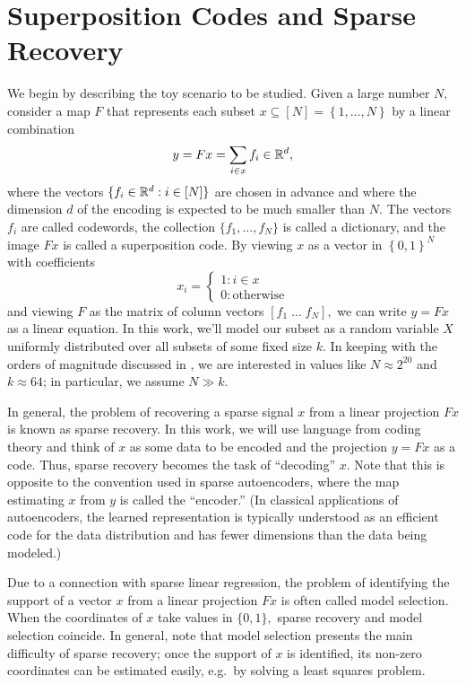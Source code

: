 \section{Superposition Codes and Sparse Recovery \label{sec:codes}}

We begin by describing the toy scenario to be studied. Given a large number $N,$ consider a map $F$ that represents each subset $x \subseteq [N] = \left\{ 1, \dots, N \right\}$ by a linear combination
$$
	y = F x = \sum_{i \in x} f_i \in \mathbb{R}^d,
$$
where the vectors $\{ f_i \in \mathbb{R}^d : i \in [N] \}$ are chosen in advance and where the dimension $d$ of the encoding is expected to be much smaller than $N.$ The vectors $f_i$ are called codewords, the collection $\{ f_1, \dots, f_N \}$ is called a dictionary, and the image $Fx$ is called a superposition code. By viewing $x$ as a vector in $\left\{ 0, 1 \right\}^N$ with coefficients
$$
	x_i = \begin{cases}
		1 \colon i \in x \\
		0 \colon \text{otherwise}
	\end{cases}
$$
and viewing $F$ as the matrix of column vectors $[f_1 \; \dots \; f_N],$ we can write $y = F x$ as a linear equation. In this work, we'll model our subset as a random variable $X$ uniformly distributed over all subsets of some fixed size $k.$ In keeping with the orders of magnitude discussed in \citet{gao_scaling_2024}, we are interested in values like $N \approx 2^{20}$ and $k \approx 64$; in particular, we assume $N \gg k.$

In general, the problem of recovering a sparse signal $x$ from a linear projection $F x$ is known as sparse recovery. In this work, we will use language from coding theory and think of $x$ as some data to be encoded and the projection $y = F x$ as a code. Thus, sparse recovery becomes the task of ``decoding'' $x.$ Note that this is opposite to the convention used in sparse autoencoders, where the map estimating $x$ from $y$ is called the ``encoder.'' (In classical applications of autoencoders, the learned representation is typically understood as an efficient code for the data distribution and has fewer dimensions than the data being modeled.)

Due to a connection with sparse linear regression, the problem of identifying the support of a vector $x$ from a linear projection $F x$ is often called model selection. When the coordinates of $x$ take values in $\{0, 1 \},$ sparse recovery and model selection coincide. In general, note that model selection presents the main difficulty of sparse recovery; once the support of $x$ is identified, its non-zero coordinates can be estimated easily, e.g.\ by solving a least squares problem.

